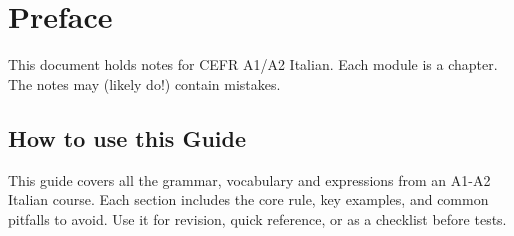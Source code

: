 
\chapter{Preface}
This document holds notes for CEFR A1/A2 Italian. Each module is a chapter. 
The notes may (likely do!) contain mistakes.

\section{How to use this Guide}
\label{how-to-use-this-guide}

This guide covers all the grammar, vocabulary and expressions from an
A1-A2 Italian course. Each section includes the core rule, key
examples, and common pitfalls to avoid. Use it for revision, quick
reference, or as a checklist before tests.
